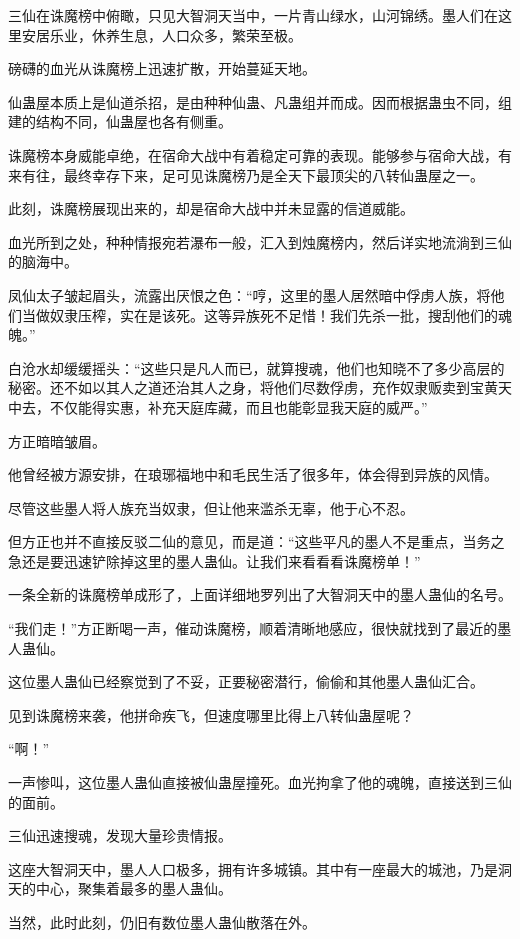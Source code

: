 \begin{this_body}
三仙在诛魔榜中俯瞰，只见大智洞天当中，一片青山绿水，山河锦绣。墨人们在这里安居乐业，休养生息，人口众多，繁荣至极。

磅礴的血光从诛魔榜上迅速扩散，开始蔓延天地。

仙蛊屋本质上是仙道杀招，是由种种仙蛊、凡蛊组并而成。因而根据蛊虫不同，组建的结构不同，仙蛊屋也各有侧重。

诛魔榜本身威能卓绝，在宿命大战中有着稳定可靠的表现。能够参与宿命大战，有来有往，最终幸存下来，足可见诛魔榜乃是全天下最顶尖的八转仙蛊屋之一。

此刻，诛魔榜展现出来的，却是宿命大战中并未显露的信道威能。

血光所到之处，种种情报宛若瀑布一般，汇入到烛魔榜内，然后详实地流淌到三仙的脑海中。

凤仙太子皱起眉头，流露出厌恨之色：“哼，这里的墨人居然暗中俘虏人族，将他们当做奴隶压榨，实在是该死。这等异族死不足惜！我们先杀一批，搜刮他们的魂魄。”

白沧水却缓缓摇头：“这些只是凡人而已，就算搜魂，他们也知晓不了多少高层的秘密。还不如以其人之道还治其人之身，将他们尽数俘虏，充作奴隶贩卖到宝黄天中去，不仅能得实惠，补充天庭库藏，而且也能彰显我天庭的威严。”

方正暗暗皱眉。

他曾经被方源安排，在琅琊福地中和毛民生活了很多年，体会得到异族的风情。

尽管这些墨人将人族充当奴隶，但让他来滥杀无辜，他于心不忍。

但方正也并不直接反驳二仙的意见，而是道：“这些平凡的墨人不是重点，当务之急还是要迅速铲除掉这里的墨人蛊仙。让我们来看看看诛魔榜单！”

一条全新的诛魔榜单成形了，上面详细地罗列出了大智洞天中的墨人蛊仙的名号。

“我们走！”方正断喝一声，催动诛魔榜，顺着清晰地感应，很快就找到了最近的墨人蛊仙。

这位墨人蛊仙已经察觉到了不妥，正要秘密潜行，偷偷和其他墨人蛊仙汇合。

见到诛魔榜来袭，他拼命疾飞，但速度哪里比得上八转仙蛊屋呢？

“啊！”

一声惨叫，这位墨人蛊仙直接被仙蛊屋撞死。血光拘拿了他的魂魄，直接送到三仙的面前。

三仙迅速搜魂，发现大量珍贵情报。

这座大智洞天中，墨人人口极多，拥有许多城镇。其中有一座最大的城池，乃是洞天的中心，聚集着最多的墨人蛊仙。

当然，此时此刻，仍旧有数位墨人蛊仙散落在外。


\end{this_body}
